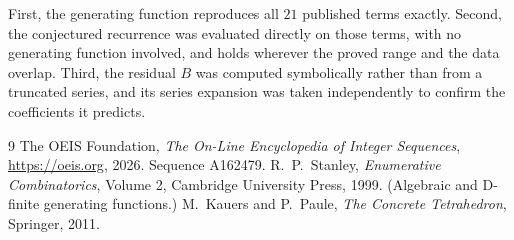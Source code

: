 \documentclass[11pt,a4paper]{article}
\theoremstyle{plain}
\theoremstyle{definition}
\begin{document}
First, the generating function reproduces all $21$ published terms exactly. Second,
the conjectured recurrence was evaluated directly on those terms, with no generating function
involved, and holds wherever the proved range and the data overlap. Third, the residual $B$ was
computed symbolically rather than from a truncated series, and its series expansion was taken
independently to confirm the coefficients it predicts.

\begin{thebibliography}{9}
 The OEIS Foundation, \emph{The On-Line Encyclopedia of Integer Sequences},
\url{https://oeis.org}, 2026. Sequence A162479.
 R.~P.~Stanley, \emph{Enumerative Combinatorics}, Volume 2, Cambridge
University Press, 1999. (Algebraic and D-finite generating functions.)
 M.~Kauers and P.~Paule, \emph{The Concrete Tetrahedron}, Springer, 2011.
\end{thebibliography}
\end{document}
